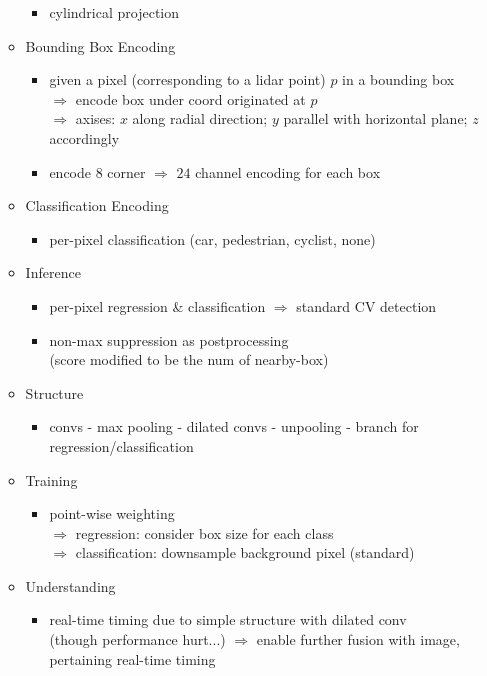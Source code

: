 \begin{itemize}
\begin{itemize}
\begin{itemize}
		\item cylindrical projection
		\end{itemize}
	\item Bounding Box Encoding
		\begin{itemize}
		\item given a pixel (corresponding to a lidar point) $p$ in a bounding box \\ 
		$\Rightarrow$ encode box under coord originated at $p$ \\
		$\Rightarrow$ axises: $x$ along radial direction; $y$ parallel with horizontal plane; $z$ accordingly
		\item encode $8$ corner $\Rightarrow$ $24$ channel encoding for each box
		\end{itemize}
	\item Classification Encoding
		\begin{itemize}
		\item per-pixel classification (car, pedestrian, cyclist, none)
		\end{itemize}
	\item Inference
		\begin{itemize}
		\item per-pixel regression \& classification $\Rightarrow$ standard CV detection
		\item non-max suppression as postprocessing \\
		(score modified to be the num of nearby-box)
		\end{itemize}
	\item Structure
		\begin{itemize}
		\item convs - max pooling - dilated convs - unpooling - branch for regression/classification
		\end{itemize}
	\item Training
		\begin{itemize}
		\item point-wise weighting \\
		$\Rightarrow$ regression: consider box size for each class \\
		$\Rightarrow$ classification: downsample background pixel (standard)
		\end{itemize}
	\item Understanding
		\begin{itemize}
		\item real-time timing due to simple structure with dilated conv \\
		(though performance hurt...)
		$\Rightarrow$ enable further fusion with image, pertaining real-time timing
		\end{itemize}
	\end{itemize}
\end{itemize}
